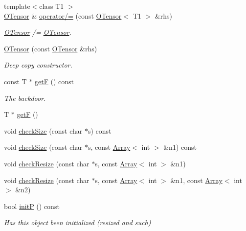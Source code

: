 \begin{DoxyCompactItemize}
{\footnotesize template$<$class T1 $>$ }\\\mbox{\hyperlink{classENSEM_1_1OTensor}{O\+Tensor}} \& \mbox{\hyperlink{classENSEM_1_1OTensor_af8fb32358b6c05989221297a9b33096c}{operator/=}} (const \mbox{\hyperlink{classENSEM_1_1OTensor}{O\+Tensor}}$<$ T1 $>$ \&rhs)
\begin{DoxyCompactList}\small\item\em \mbox{\hyperlink{classENSEM_1_1OTensor}{O\+Tensor}} /= \mbox{\hyperlink{classENSEM_1_1OTensor}{O\+Tensor}}. \end{DoxyCompactList}\item 
\mbox{\hyperlink{classENSEM_1_1OTensor_aaf07253b5940da32a50af556d2f2afc6}{O\+Tensor}} (const \mbox{\hyperlink{classENSEM_1_1OTensor}{O\+Tensor}} \&rhs)
\begin{DoxyCompactList}\small\item\em Deep copy constructor. \end{DoxyCompactList}\item 
const T $\ast$ \mbox{\hyperlink{classENSEM_1_1OTensor_ac9462508146fa6ceba2797c9994ea54c}{getF}} () const
\begin{DoxyCompactList}\small\item\em The backdoor. \end{DoxyCompactList}\item 
T $\ast$ \mbox{\hyperlink{classENSEM_1_1OTensor_acaf63577c9d67fe58f649ae9fac008c1}{getF}} ()
\item 
void \mbox{\hyperlink{classENSEM_1_1OTensor_a09bfbf9385ec1bbe5050d4df43850f63}{check\+Size}} (const char $\ast$s) const
\item 
void \mbox{\hyperlink{classENSEM_1_1OTensor_ac59e6465eb9803b05edcdec04f8d2370}{check\+Size}} (const char $\ast$s, const \mbox{\hyperlink{classXMLArray_1_1Array}{Array}}$<$ int $>$ \&n1) const
\item 
void \mbox{\hyperlink{classENSEM_1_1OTensor_aa273eae7f1de4b37e91302da5edf279b}{check\+Resize}} (const char $\ast$s, const \mbox{\hyperlink{classXMLArray_1_1Array}{Array}}$<$ int $>$ \&n1)
\item 
void \mbox{\hyperlink{classENSEM_1_1OTensor_a0f656f8ef2b19a258a8c86a4e80ea902}{check\+Resize}} (const char $\ast$s, const \mbox{\hyperlink{classXMLArray_1_1Array}{Array}}$<$ int $>$ \&n1, const \mbox{\hyperlink{classXMLArray_1_1Array}{Array}}$<$ int $>$ \&n2)
\item 
bool \mbox{\hyperlink{classENSEM_1_1OTensor_a3f591732bdd0b358cde1069b21fbf1f5}{initP}} () const
\begin{DoxyCompactList}\small\item\em Has this object been initialized (resized and such) \end{DoxyCompactList}\item 

\end{DoxyCompactItemize}
